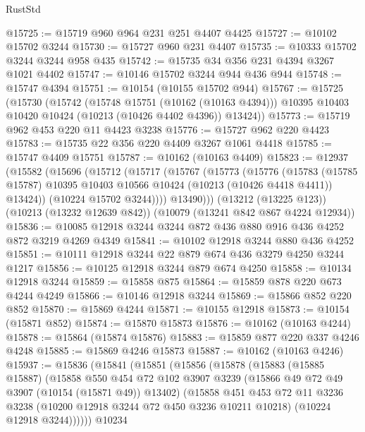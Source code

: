 \begin{lexlean}{RustStd}
\begin{coremodule}
{\begin{coremodule}
{{{{{{{{{{{{{{{{{{{{{{{{{{@15725 := @15719 @960 @964 @231 @251 @4407 @4425
@15727 := @10102 @15702 @3244
@15730 := @15727 @960 @231 @4407
@15735 := @10333 @15702 @3244 @3244 @958 @435
@15742 := @15735 @34 @356 @231 @4394 @3267 @1021 @4402
@15747 := @10146 @15702 @3244 @944 @436 @944
@15748 := @15747 @4394
@15751 := @10154 (@10155 @15702 @944)
@15767 := @15725
    (@15730
      (@15742
        (@15748 @15751 (@10162 (@10163 @4394)))
        @10395
        @10403
        @10420
        @10424
        (@10213 (@10426 @4402 @4396))
        @13424))
@15773 := @15719 @962 @453 @220 @11 @4423 @3238
@15776 := @15727 @962 @220 @4423
@15783 := @15735 @22 @356 @220 @4409 @3267 @1061 @4418
@15785 := @15747 @4409 @15751
@15787 := @10162 (@10163 @4409)
@15823 := @12937
    (@15582
      (@15696
        (@15712
          (@15717
            (@15767
              (@15773
                (@15776
                  (@15783
                    (@15785 @15787)
                    @10395
                    @10403
                    @10566
                    @10424
                    (@10213 (@10426 @4418 @4411))
                    @13424))
                (@10224 @15702 @3244))))
          @13490)))
    (@13212 (@13225 @123))
    (@10213 (@13232 @12639 @842))
    (@10079 (@13241 @842 @867 @4224 @12934))
@15836 := @10085 @12918 @3244 @3244 @872 @436 @880 @916 @436 @4252 @872 @3219 @4269 @4349
@15841 := @10102 @12918 @3244 @880 @436 @4252
@15851 := @10111 @12918 @3244 @22 @879 @674 @436 @3279 @4250 @3244 @1217
@15856 := @10125 @12918 @3244 @879 @674 @4250
@15858 := @10134 @12918 @3244
@15859 := @15858 @875
@15864 := @15859 @878 @220 @673 @4244 @4249
@15866 := @10146 @12918 @3244
@15869 := @15866 @852 @220 @852
@15870 := @15869 @4244
@15871 := @10155 @12918
@15873 := @10154 (@15871 @852)
@15874 := @15870 @15873
@15876 := @10162 (@10163 @4244)
@15878 := @15864 (@15874 @15876)
@15883 := @15859 @877 @220 @337 @4246 @4248
@15885 := @15869 @4246 @15873
@15887 := @10162 (@10163 @4246)
@15937 := @15836
    (@15841
      (@15851
        (@15856
          (@15878
            (@15883
              (@15885 @15887)
              (@15858
                @550
                @454
                @72
                @102
                @3907
                @3239
                (@15866 @49 @72 @49 @3907 (@10154 (@15871 @49)) @13402)
                (@15858
                  @451
                  @453
                  @72
                  @11
                  @3236
                  @3238
                  (@10200 @12918 @3244 @72 @450 @3236 @10211 @10218)
                  (@10224 @12918 @3244))))))
        @10234
}}}}}}}}}}}}}}}}}}}}}}}}}}
\end{coremodule}}
\end{coremodule}
\end{lexlean}
